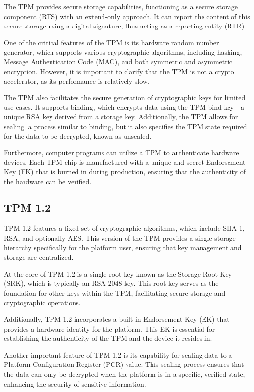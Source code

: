 The TPM provides secure storage capabilities, functioning as a secure
storage component (RTS) with an extend-only approach. It can report
the content of this secure storage using a digital signature, thus
acting as a reporting entity (RTR).

One of the critical features of the TPM is its hardware random number
generator, which supports various cryptographic algorithms, including
hashing, Message Authentication Code (MAC), and both symmetric and
asymmetric encryption. However, it is important to clarify that the
TPM is not a crypto accelerator, as its performance is relatively
slow.

The TPM also facilitates the secure generation of cryptographic keys
for limited use cases. It supports binding, which encrypts data using
the TPM bind key—a unique RSA key derived from a storage key.
Additionally, the TPM allows for sealing, a process similar to
binding, but it also specifies the TPM state required for the data to
be decrypted, known as unsealed.

Furthermore, computer programs can utilize a TPM to authenticate
hardware devices. Each TPM chip is manufactured with a unique and
secret Endorsement Key (EK) that is burned in during production,
ensuring that the authenticity of the hardware can be verified.

\subsection{TPM 1.2}

TPM 1.2 features a fixed set of cryptographic algorithms, which
include SHA-1, RSA, and optionally AES. This version of the TPM
provides a single storage hierarchy specifically for the platform
user, ensuring that key management and storage are centralized.

At the core of TPM 1.2 is a single root key known as the Storage Root
Key (SRK), which is typically an RSA-2048 key. This root key serves as
the foundation for other keys within the TPM, facilitating secure
storage and cryptographic operations.

Additionally, TPM 1.2 incorporates a built-in Endorsement Key (EK)
that provides a hardware identity for the platform. This EK is
essential for establishing the authenticity of the TPM and the device
it resides in. 

Another important feature of TPM 1.2 is its capability for sealing
data to a Platform Configuration Register (PCR) value. This sealing
process ensures that the data can only be decrypted when the platform
is in a specific, verified state, enhancing the security of sensitive
information.

